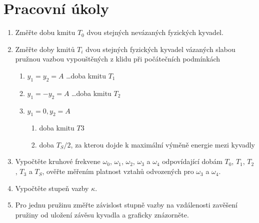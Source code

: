 \documentclass[a4paper]{article}
\author{Vladislav Wohlrath}
\begin{document}
\begin{titlepage}

\end{titlepage}

\section*{Pracovní úkoly}
\begin{enumerate}
\item Změřte dobu kmitu $T_0$ dvou stejných nevázaných fyzických kyvadel.
\item Změřte doby kmitů $T_i$ dvou stejných fyzických kyvadel vázaných slabou pružnou vazbou vypouštěných z klidu při počátečních podmínkách
\begin{enumerate}
\item $y_1=y_2=A$ \ldots doba kmitu $T_1$
\item $y_1=-y_2=A$ \ldots doba kmitu $T_2$
\item $y_1=0, y_2=A$
	\begin{enumerate}
	\item doba kmitu $T3$
	\item doba $T_S/2$, za kterou dojde k maximální výměně energie mezi kyvadly
	\end{enumerate}
\end{enumerate}
\item Vypočtěte kruhové frekvene $\omega _0$, $\omega _1$, $\omega _2$, $\omega _3$ a $\omega _4$ odpovídající dobám $T_0$, $T_1$, $T_2$, $T_3$ a $T_S$, ověřte měřením platnost vztahů odvozených pro $\omega _3$ a $\omega _4$.
\item Vypočtěte stupeň vazby $\kappa$.
\item Pro jednu pružinu změřte závislost stupně vazby na vzdálenosti zavěšení pružiny od uložení závěsu kyvadla a graficky znázorněte.
\end{enumerate}












\printbibliography[title={Seznam použité literatury}]
\end{document}
